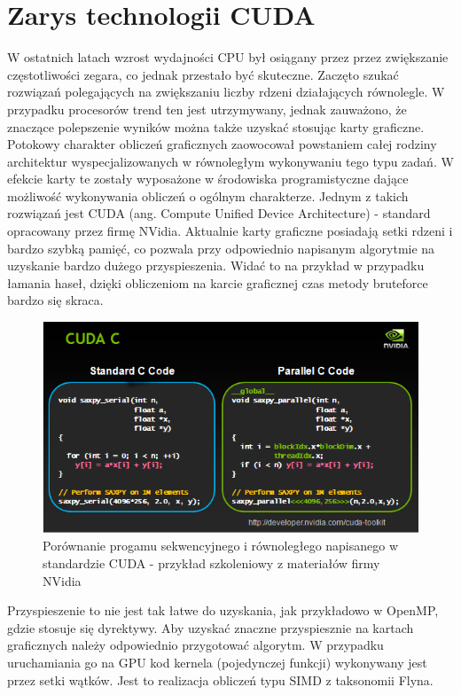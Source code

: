 \documentclass[a4paper,12pt]{article}
\begin{document}
\section*{Zarys technologii CUDA}
W ostatnich latach wzrost wydajności CPU był osiągany przez przez zwiększanie częstotliwości zegara, co jednak przestało być skuteczne. Zaczęto szukać rozwiązań polegających na zwiększaniu liczby rdzeni działających równolegle. W przypadku procesorów trend ten jest utrzymywany, jednak zauważono, że znaczące polepszenie wyników można także uzyskać stosując karty graficzne. Potokowy charakter obliczeń graficznych zaowocował powstaniem całej rodziny architektur wyspecjalizowanych w równoległym wykonywaniu tego typu zadań. W efekcie karty te zostały wyposażone w środowiska programistyczne dające możliwość wykonywania obliczeń o ogólnym charakterze. Jednym z takich rozwiązań jest CUDA (ang. Compute Unified Device Architecture) - standard opracowany przez firmę NVidia. 
	Aktualnie karty graficzne posiadają setki rdzeni i bardzo szybką pamięć, co pozwala przy odpowiednio napisanym algorytmie na uzyskanie bardzo dużego przyspieszenia. Widać to na przykład w przypadku łamania haseł, dzięki obliczeniom na karcie graficznej czas metody bruteforce bardzo się skraca. 
\begin{figure}[H]
  \vspace{5pt}
  \centering
  \begin{center}
  \includegraphics[width=1.0\textwidth]{images/cuda.png}
  \end{center}
  \caption{Porównanie progamu sekwencyjnego i równoległego napisanego w standardzie CUDA - przykład szkoleniowy z materiałów firmy NVidia}
 \end{figure}
 Przyspieszenie to nie jest tak łatwe do uzyskania, jak przykładowo w OpenMP, gdzie stosuje się dyrektywy. Aby uzyskać znaczne przyspiesznie na kartach graficznych należy odpowiednio przygotować algorytm. W przypadku uruchamiania go na GPU kod kernela (pojedynczej funkcji) wykonywany jest przez setki wątków. Jest to realizacja obliczeń typu SIMD z taksonomii Flyna. 
\end{document}

